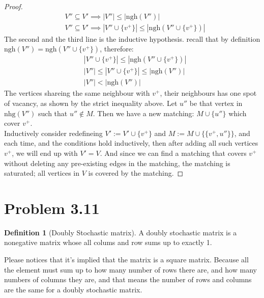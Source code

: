 \documentclass[]{article}
\theoremstyle{definition}
\newtheorem{definition}{Definition}
\begin{document}
\begin{proof}
\begin{align}
            & V''\subseteq V' \implies 
            |V''|\le |\text{ngh}(V'')|
            \\
            & V''\subseteq V' \implies 
            |V''\cup\{v^+\}|\le |\text{ngh}(V''\cup\{v^+\})|
        \end{align}
        The second and the third line is the inductive hypothesis. recall that by definition $\text{ngh}(V'') = \text{ngh}(V''\cup \{v^+\})$, therefore: 
        \begin{align}
            & |V''\cup\{v^+\}|\le |\text{ngh}(V''\cup\{v^+\})|
            \\
            & |V''| \le |V''\cup\{v^+\}|\le |\text{ngh}(V'')|
            \\
            & |V''| < |\text{ngh}(V'')|
        \end{align}
        The vertices shareing the same neighbour with $v^+$, their neighbours has one spot of vacancy, as shown by the strict inequality above. Let $u''$ be that vertex in $\text{nhg}(V'')$ such that $u''\not\in M$. Then we have a new matching: $M\cup \{u''\}$ which cover $v^+$. 
        \\[1.1em]
        Inductively consider redefineing $V':= V'\cup \{v^+\}$ and $M:= M\cup \{\{v^+,u''\}\}$, and each time, and the conditions hold inductively, then after adding all such vertices $v^+$, we will end up with $V' = V$. And since we can find a matching that covers $v^+$ without deleting any pre-existing edges in the matching, the matching is saturated; all vertices in $V$ is covered by the matching. 
    \end{proof}
\section{Problem 3.11}
    \begin{definition}[Doubly Stochastic matrix]
        A doubly stochastic matrix is a nonegative matrix whose all colums and row sums up to exactly 1. 
    \end{definition}
    Please notices that it's implied that the matrix is a square matrix. Because all the element must sum up to how many number of rows there are, and how many numbers of columns they are, and that means the number of rows and columns are the same for a doubly stochastic matrix. 
\end{document}
